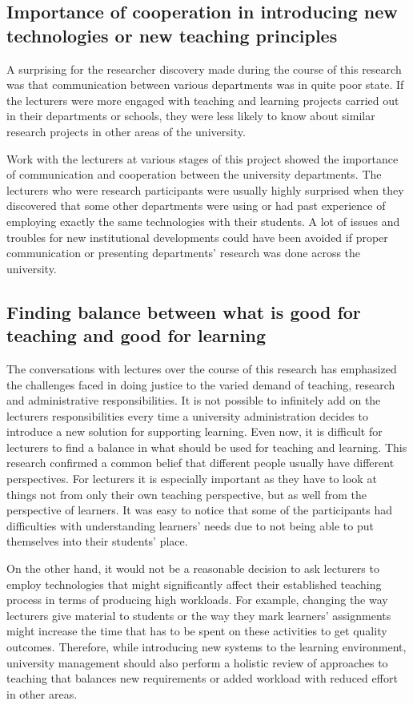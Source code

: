 \subsection[Cooperation and Communication]{Importance of cooperation in 
introducing new technologies or new teaching principles}

A surprising for the researcher discovery made during the course of this
research was that communication between various departments was in quite poor
state. If the lecturers were more engaged with teaching and learning projects
carried out in their departments or schools, they were less likely to know about
similar research projects in other areas of the university. 

Work with the lecturers at various stages of this project showed the importance
of communication and cooperation between the university departments. The
lecturers who were research participants were usually highly surprised when they
discovered that some other departments were using or had past experience of
employing exactly the same technologies with their students. A lot of issues and
troubles for new institutional developments could have been avoided if proper
communication or presenting departments' research was done across the university.

\subsection[Finding Balance]{Finding balance between what is good for teaching
and good for learning}

The conversations with lectures over the course of this research has emphasized
the challenges faced in doing justice to the varied demand of teaching, research
and administrative responsibilities. It is not possible to infinitely add on the
lecturers responsibilities every time a university administration decides to
introduce a new solution for supporting learning. Even now, it is difficult for
lecturers to find a balance in what should be used for teaching and learning.
This research confirmed a common belief that different people usually have
different perspectives. For lecturers it is especially important as they have to
look at things not from only their own teaching perspective, but as well from
the perspective of learners. It was easy to notice that some of the participants
had difficulties with understanding learners' needs due to not being able to put
themselves into their students' place.

On the other hand, it would not be a reasonable decision to ask lecturers to
employ technologies that might significantly affect their established
teaching process in terms of producing high workloads. For example, changing the
way lecturers give material to students or the way they mark learners'
assignments might increase the time that has to be spent on these activities to
get quality outcomes. Therefore, while introducing new systems to the learning
environment, university management should also perform a holistic review of
approaches to teaching that balances new requirements or added workload with
reduced effort in other areas.

